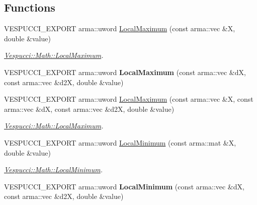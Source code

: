 \subsection*{Functions}
\begin{DoxyCompactItemize}
\item 
V\+E\+S\+P\+U\+C\+C\+I\+\_\+\+E\+X\+P\+O\+RT arma\+::uword \hyperlink{namespace_vespucci_1_1_math_a1b9ee5b01394da54d86c4116912dc161}{Local\+Maximum} (const arma\+::vec \&X, double \&value)
\begin{DoxyCompactList}\small\item\em \hyperlink{namespace_vespucci_1_1_math_a1b9ee5b01394da54d86c4116912dc161}{Vespucci\+::\+Math\+::\+Local\+Maximum}. \end{DoxyCompactList}\item 
V\+E\+S\+P\+U\+C\+C\+I\+\_\+\+E\+X\+P\+O\+RT arma\+::uword {\bfseries Local\+Maximum} (const arma\+::vec \&dX, const arma\+::vec \&d2X, double \&value)\hypertarget{namespace_vespucci_1_1_math_ad2bd884bf28023bec379dcbcd22ef247}{}\label{namespace_vespucci_1_1_math_ad2bd884bf28023bec379dcbcd22ef247}

\item 
V\+E\+S\+P\+U\+C\+C\+I\+\_\+\+E\+X\+P\+O\+RT arma\+::uword \hyperlink{namespace_vespucci_1_1_math_a064cbb05026e7ff528ff4990e25afa4e}{Local\+Maximum} (const arma\+::vec \&X, const arma\+::vec \&dX, const arma\+::vec \&d2X, double \&value)
\begin{DoxyCompactList}\small\item\em \hyperlink{namespace_vespucci_1_1_math_a1b9ee5b01394da54d86c4116912dc161}{Vespucci\+::\+Math\+::\+Local\+Maximum}. \end{DoxyCompactList}\item 
V\+E\+S\+P\+U\+C\+C\+I\+\_\+\+E\+X\+P\+O\+RT arma\+::uword \hyperlink{namespace_vespucci_1_1_math_ad2cb6ff82f9df5c6779f4c2b16ca5c53}{Local\+Minimum} (const arma\+::mat \&X, double \&value)
\begin{DoxyCompactList}\small\item\em \hyperlink{namespace_vespucci_1_1_math_ad2cb6ff82f9df5c6779f4c2b16ca5c53}{Vespucci\+::\+Math\+::\+Local\+Minimum}. \end{DoxyCompactList}\item 
V\+E\+S\+P\+U\+C\+C\+I\+\_\+\+E\+X\+P\+O\+RT arma\+::uword {\bfseries Local\+Minimum} (const arma\+::vec \&dX, const arma\+::vec \&d2X, double \&value)\hypertarget{namespace_vespucci_1_1_math_a67eee243b5f036a006a5b719988bf6c8}{}\label{namespace_vespucci_1_1_math_a67eee243b5f036a006a5b719988bf6c8}


\end{DoxyCompactItemize}
